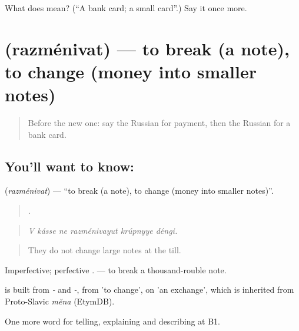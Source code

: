 \begin{tcolorbox}[breakable,colback=teal!4,colframe=teal!35!black,title={Before you move on}]
What does  mean? (\textquotedblleft{}A bank card; a small card\textquotedblright{}.) Say it once more.
\end{tcolorbox}
\section[\texorpdfstring{\ru{разменивать} (razménivat)}{разменивать (razménivat)}]{ (razménivat) — to break (a note), to change (money into smaller notes)}

\label{lesson:RU-C455-razmenivat}



\begin{quote}
Before the new one: say the Russian for payment, then the Russian for a bank card.
\end{quote}

\subsection*{You'll want to know: }
\textbf{} (\emph{razménivat}) — \textquotedblleft{}to break (a note), to change (money into smaller notes)\textquotedblright{}.

\begin{quote}
     .
\end{quote}

\begin{quote}
\emph{V kásse ne razménivayut krúpnyye déngi.}
\end{quote}

\begin{quote}
They do not change large notes at the till.
\end{quote}

Imperfective; perfective \emph{}. \emph{ } — to break a thousand-rouble note.

\begin{cousinweb}
\emph{} is built from \emph{-} and \emph{-}, from \emph{} 'to change', on \emph{} 'an exchange', which is inherited from Proto-Slavic \emph{měna} (EtymDB).
\end{cousinweb}

\begin{grammarlens}[title={What you've built}]
One more word for telling, explaining and describing at B1.
\end{grammarlens}

